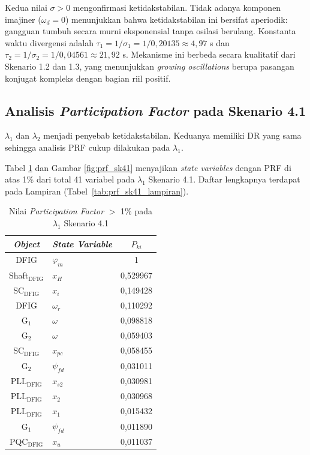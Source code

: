 Kedua nilai $\sigma > 0$ mengonfirmasi ketidakstabilan. Tidak adanya komponen
imajiner ($\omega_d = 0$) menunjukkan bahwa ketidakstabilan ini bersifat
aperiodik: gangguan tumbuh secara murni eksponensial tanpa osilasi berulang.
Konstanta waktu divergensi adalah $\tau_1 = 1/\sigma_1 = 1/0{,}20135 \approx 4{,}97$ s
dan $\tau_2 = 1/\sigma_2 = 1/0{,}04561 \approx 21{,}92$ s. Mekanisme ini berbeda
secara kualitatif dari Skenario 1.2 dan 1.3, yang menunjukkan \textit{growing
oscillations} berupa pasangan konjugat kompleks dengan bagian riil positif.

\subsection{Analisis \textit{Participation Factor} pada Skenario 4.1}

$\lambda_1$ dan $\lambda_2$ menjadi penyebab ketidakstabilan. Keduanya memiliki
DR yang sama sehingga analisis PRF cukup dilakukan pada $\lambda_1$.

Tabel \ref{tab:prf_sk41} dan Gambar \ref{fig:prf_sk41} menyajikan \textit{state variables}
dengan PRF di atas 1\% dari total 41 variabel pada $\lambda_1$ Skenario 4.1.
Daftar lengkapnya terdapat pada Lampiran (Tabel~\ref{tab:prf_sk41_lampiran}).

\begin{table}[h]
	\caption{Nilai \textit{Participation Factor} $>$ 1\% pada $\lambda_1$
	Skenario 4.1}
	\vspace{0.5em}
	\centering
	\fontsize{12}{14.4}\selectfont
	\setlength{\tabcolsep}{5pt}
	\begin{tabular}{c >{\centering\arraybackslash}p{6cm} c}
		\toprule
		\multicolumn{1}{c}{\textbf{\textit{Object}}} & \textbf{\textit{State
		Variable}} & \textbf{$P_{ki}$} \\
		\midrule
		DFIG & $\varphi_m$ & 1          \\
		Shaft$_\text{DFIG}$ & $x_H$ & 0,529967  \\
		SC$_\text{DFIG}$ & $x_i$ & 0,149428  \\
		DFIG & $\omega_r$ & 0,110292  \\
		G$_1$ & $\omega$ & 0,098818  \\
		G$_2$ & $\omega$ & 0,059403  \\
		SC$_\text{DFIG}$ & $x_{pc}$ & 0,058455  \\
		G$_2$ & $\psi_{fd}$ & 0,031011  \\
		PLL$_\text{DFIG}$ & $x_{s2}$ & 0,030981  \\
		PLL$_\text{DFIG}$ & $x_2$ & 0,030968  \\
		PLL$_\text{DFIG}$ & $x_1$ & 0,015432  \\
		G$_1$ & $\psi_{fd}$ & 0,011890  \\
		PQC$_\text{DFIG}$ & $x_u$ & 0,011037  \\
		\bottomrule
	\end{tabular}
	\label{tab:prf_sk41}
\end{table}

